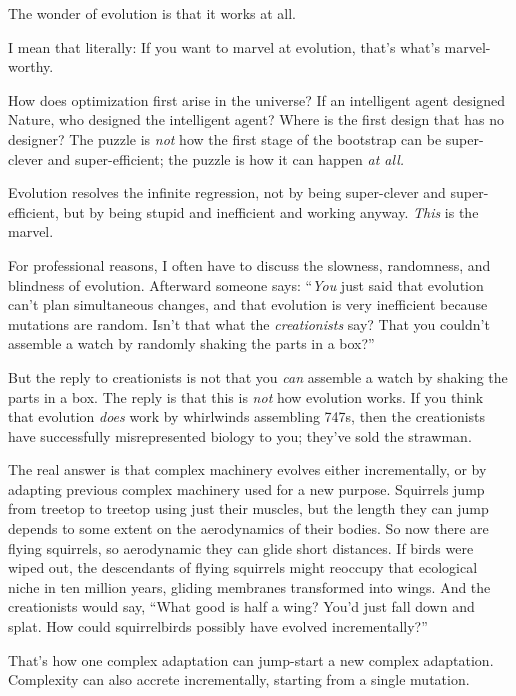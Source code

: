 \myendsectiontext


\bigskip


{
 The wonder of evolution is that it works at all. }

{
 I mean that literally: If you want to marvel at evolution,
that's what's marvel-worthy.}

{
 How does optimization first arise in the universe? If an
intelligent agent designed Nature, who designed the intelligent agent?
Where is the first design that has no designer? The puzzle is
\textit{not} how the first stage of the bootstrap can be super-clever
and super-efficient; the puzzle is how it can happen \textit{at all.}}

{
 Evolution resolves the infinite regression, not by being
super-clever and super-efficient, but by being stupid and inefficient
and working anyway. \textit{This} is the marvel.}

{
 For professional reasons, I often have to discuss the slowness,
randomness, and blindness of evolution. Afterward someone says:
``\textit{You} just said that evolution
can't plan simultaneous changes, and that evolution is
very inefficient because mutations are random. Isn't
that what the \textit{creationists} say? That you
couldn't assemble a watch by randomly shaking the parts
in a box?''}

{
 But the reply to creationists is not that you \textit{can}
assemble a watch by shaking the parts in a box. The reply is that this
is \textit{not} how evolution works. If you think that evolution
\textit{does} work by whirlwinds assembling 747s, then the creationists
have successfully misrepresented biology to you;
they've sold the strawman.}

{
 The real answer is that complex machinery evolves either
incrementally, or by adapting previous complex machinery used for a new
purpose. Squirrels jump from treetop to treetop using just their
muscles, but the length they can jump depends to some extent on the
aerodynamics of their bodies. So now there are flying squirrels, so
aerodynamic they can glide short distances. If birds were wiped out,
the descendants of flying squirrels might reoccupy that ecological
niche in ten million years, gliding membranes transformed into wings.
And the creationists would say, ``What good is half a
wing? You'd just fall down and splat. How could
squirrelbirds possibly have evolved incrementally?''}

{
 That's how one complex adaptation can jump-start a
new complex adaptation. Complexity can also accrete incrementally,
starting from a single mutation.}

